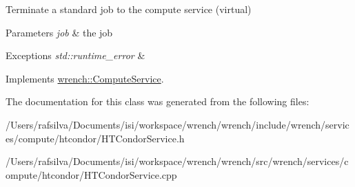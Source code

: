 Terminate a standard job to the compute service (virtual) 


\begin{DoxyParams}{Parameters}
{\em job} & the job\\
\hline
\end{DoxyParams}

\begin{DoxyExceptions}{Exceptions}
{\em std\+::runtime\+\_\+error} & \\
\hline
\end{DoxyExceptions}


Implements \hyperlink{classwrench_1_1_compute_service}{wrench\+::\+Compute\+Service}.



The documentation for this class was generated from the following files\+:\begin{DoxyCompactItemize}
\item 
/\+Users/rafsilva/\+Documents/isi/workspace/wrench/wrench/include/wrench/services/compute/htcondor/H\+T\+Condor\+Service.\+h\item 
/\+Users/rafsilva/\+Documents/isi/workspace/wrench/wrench/src/wrench/services/compute/htcondor/H\+T\+Condor\+Service.\+cpp\end{DoxyCompactItemize}
